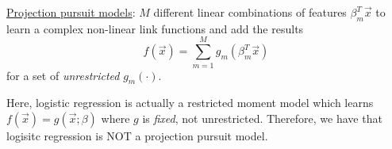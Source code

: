 \tffalse

\underline{Projection pursuit models}:  $M$ different linear combinations of features $\beta_m^T \vec{x}$ to learn a complex non-linear link functions and add the results
$$
f(\vec{x}) = \sum_{m=1}^M g_m(\beta_m^T \vec{x})
$$
for a set of \emph{unrestricted} $g_m(\cdot)$.

Here, logistic regression is actually a restricted moment model which learns $f(\vec{x}) = g(\vec{x}; \beta)$ where $g$ is \emph{fixed}, not unrestricted. Therefore, we have that logisitc regression is NOT a projection pursuit model.